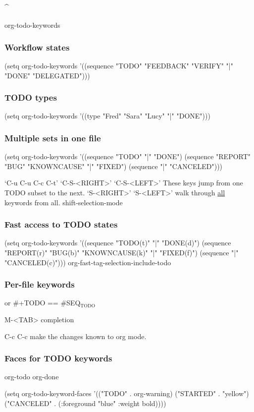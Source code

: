 \documentclass[11pt]{article}
\begin{document}
\subsubsection{\^{}}
\label{sec:org298ded8}
org-todo-keywords
\subsubsection{Workflow states}
\label{sec:org853f4a3}
(setq org-todo-keywords
   '((sequence "TODO" "FEEDBACK" "VERIFY" "|" "DONE" "DELEGATED")))
\subsubsection{{\bfseries\sffamily TODO} types}
\label{sec:org05f7f6a}
(setq org-todo-keywords '((type "Fred" "Sara" "Lucy" "|" "DONE")))
\subsubsection{Multiple sets in one file}
\label{sec:orge76d66a}
(setq org-todo-keywords
      '((sequence "TODO" "|" "DONE")
        (sequence "REPORT" "BUG" "KNOWNCAUSE" "|" "FIXED")
        (sequence "|" "CANCELED")))

‘C-u C-u C-c C-t’
‘C-S-<RIGHT>’
‘C-S-<LEFT>’
     These keys jump from one TODO subset to the next.
‘S-<RIGHT>’
‘S-<LEFT>’
     walk through \uline{all} keywords from all.
shift-selection-mode
\subsubsection{Fast access to TODO states}
\label{sec:orgbfe3480}
     (setq org-todo-keywords
           '((sequence "TODO(t)" "|" "DONE(d)")
             (sequence "REPORT(r)" "BUG(b)" "KNOWNCAUSE(k)" "|" "FIXED(f)")
             (sequence "|" "CANCELED(c)")))
org-fast-tag-selection-include-todo
\subsubsection{Per-file keywords}
\label{sec:orgcdba399}
or
\#+TODO == \#SEQ\(_{\text{TODO}}\)

M-<TAB> completion

C-c C-c  make the changes known to org mode.
\subsubsection{Faces for TODO keywords}
\label{sec:org32296c3}
org-todo 
org-done

(setq org-todo-keyword-faces
           '(("TODO" . org-warning) ("STARTED" . "yellow")
             ("CANCELED" . (:foreground "blue" :weight bold))))
\end{document}
